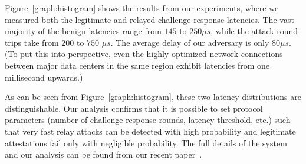 Figure~\ref{graph:histogram} shows the results from our experiments, where we measured both the legitimate and relayed challenge-response latencies. The vast majority of the benign latencies range from $145$ to $250 \mu s$, while the attack round-trips take from $200$ to $750$ $\mu s$. The average delay of our adversary is only $80 \mu s$. (To put this into perspective, even the highly-optimized network connections between major data centers in the same region exhibit latencies from one millisecond upwards.) 

As can be seen from Figure~\ref{graph:histogram}, these two latency distributions are distinguishable. Our analysis confirms that it is possible to set protocol parameters (number of challenge-response rounds, latency threshold, etc.) such that very fast relay attacks can be detected with high probability and legitimate attestations fail only with negligible probability. The full details of the \proximitee system and our analysis can be found from our recent paper~\cite{proximitee}.





